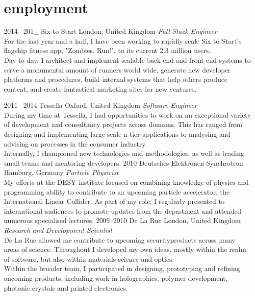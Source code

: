 \documentclass[]{friggeri-cv} %
\begin{document}

\section{employment}

\begin{entrylist}

\entry
{2014-- 201\_ }
{Six to Start}
{London, United Kingdom}
{\emph{Full Stack Engineer} \\ 
For the last year and a half, I have been working to rapidly scale Six to Start's flagship fitness app, "Zombies, Run!", to its current 2.3 million users. \\
Day to day, I architect and implement scalable back-end and front-end systems to serve a monumental amount of runners world wide, generate new developer platforms and procedures, build internal systems that help others produce content, and create fantastical marketing sites for new ventures. } 


\entry
{2011-- 2014 }
{Tessella}
{Oxford, United Kingdom}
{\emph{Software Engineer} \\
During my time at Tessella, I had opportunities to work on an exceptional variety of development and consultancy projects across domains. This has ranged from designing and implementing large scale n-tier applications to analysing and advising on processes in the consumer industry.\\
Internally, I championed new technologies and methodologies, as well as leading small teams and mentoring developers.} 
\entry
{2010}
{Deutsches Elektronen-Synchrotron}
{Hamburg, Germany}
{\emph{Particle Physicist} \\
My efforts at the DESY institute focused on combining knowledge of physics and programming ability to contribute to an upcoming particle accelerator, the International Linear Collider. As part of my role, I regularly presented to international audiences to promote updates from the department and attended numerous specialised lectures.} 
\entry
{2009--2010}
{De La Rue}
{London, United Kingdom}
{\emph{Research and Development Scientist} \\
De La Rue allowed me contribute to upcoming securityproducts across many areas of science. Throughout I developed my own ideas, mostly within the realm of software, but also within materials science and optics. \\
Within the broader team, I participated in designing, prototyping and refining oncoming products, including work in holographics, polymer development, photonic crystals and printed electronics. }

\end{entrylist}
\end{document}
